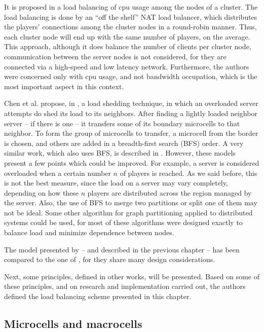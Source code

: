 It is proposed in \cite{lu2006lbm} a load balancing of cpu usage among the nodes of a cluster. The load balancing is done by an ``off the shelf'' NAT load balancer, which distributes the players' connections among the cluster nodes in a round-robin manner. Thus, each cluster node will end up with the same number of players, on the average. This approach, although it does balance the number of clients per cluster node, communication between the server nodes is not considered, for they are connected via a high-speed and low latency network. Furthermore, the authors were concerned only with cpu usage, and not bandwidth occupation, which is the most important aspect in this context.

Chen et al. propose, in \cite{chen2005lad}, a load shedding technique, in which an overloaded server attempts do shed its load to its neighbors. After finding a lightly loaded neighbor server -- if there is one -- it transfers some of its boundary microcells to that neighbor. To form the group of microcells to transfer, a microcell from the border is chosen, and others are added in a breadth-first search (BFS) order. A very similar work, which also uses BFS, is described in \cite{duong2003dls}. However, these models present a few points which could be improved. For example, a server is considered overloaded when a certain number $n$ of players is reached. As we said before, this is not the best measure, since the load on a server may vary completely, depending on how these $n$ players are distributed across the region managed by the server. Also, the use of BFS to merge two partitions or split one of them may not be ideal. Some other algorithm for graph partitioning applied to distributed systems \cite{kernighan1970ehp,fiduccia1982lth,karypis1999fah,hendrickson1995isg} could be used, for most of these algorithms were designed exactly to balance load and minimize dependence between nodes.

The model presented by \cite{ahmed2008mol} -- and described in the previous chapter -- has been compared to the one of \cite{bezerra2009lbs}, for they share many design considerations.

Next, some principles, defined in other works, will be presented. Based on some of these principles, and on research and implementation carried out, the authors defined the load balancing scheme presented in this chapter.

\subsection{Microcells and macrocells}
\label{sec:micro}

